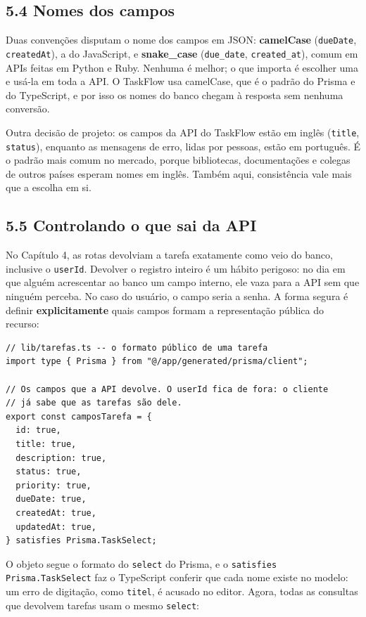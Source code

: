 \subsection{5.4 Nomes dos campos}

Duas convenções disputam o nome dos campos em JSON: \textbf{camelCase} (\texttt{dueDate}, \texttt{createdAt}), a do JavaScript, e \textbf{snake\_case} (\texttt{due\_date}, \texttt{created\_at}), comum em APIs feitas em Python e Ruby. Nenhuma é melhor; o que importa é escolher uma e usá-la em toda a API. O TaskFlow usa camelCase, que é o padrão do Prisma e do TypeScript, e por isso os nomes do banco chegam à resposta sem nenhuma conversão.

Outra decisão de projeto: os campos da API do TaskFlow estão em inglês (\texttt{title}, \texttt{status}), enquanto as mensagens de erro, lidas por pessoas, estão em português. É o padrão mais comum no mercado, porque bibliotecas, documentações e colegas de outros países esperam nomes em inglês. Também aqui, consistência vale mais que a escolha em si.

\subsection{5.5 Controlando o que sai da API}

No Capítulo 4, as rotas devolviam a tarefa exatamente como veio do banco, inclusive o \texttt{userId}. Devolver o registro inteiro é um hábito perigoso: no dia em que alguém acrescentar ao banco um campo interno, ele vaza para a API sem que ninguém perceba. No caso do usuário, o campo seria a senha. A forma segura é definir \textbf{explicitamente} quais campos formam a representação pública do recurso:

\begin{codigo}
\begin{Verbatim}[breaklines=true, breaksymbolleft={}, fontsize=\footnotesize]
// lib/tarefas.ts -- o formato público de uma tarefa
import type { Prisma } from "@/app/generated/prisma/client";

// Os campos que a API devolve. O userId fica de fora: o cliente
// já sabe que as tarefas são dele.
export const camposTarefa = {
  id: true,
  title: true,
  description: true,
  status: true,
  priority: true,
  dueDate: true,
  createdAt: true,
  updatedAt: true,
} satisfies Prisma.TaskSelect;
\end{Verbatim}
\end{codigo}

O objeto segue o formato do \texttt{select} do Prisma, e o \texttt{satisfies Prisma.TaskSelect} faz o TypeScript conferir que cada nome existe no modelo: um erro de digitação, como \texttt{titel}, é acusado no editor. Agora, todas as consultas que devolvem tarefas usam o mesmo \texttt{select}:

